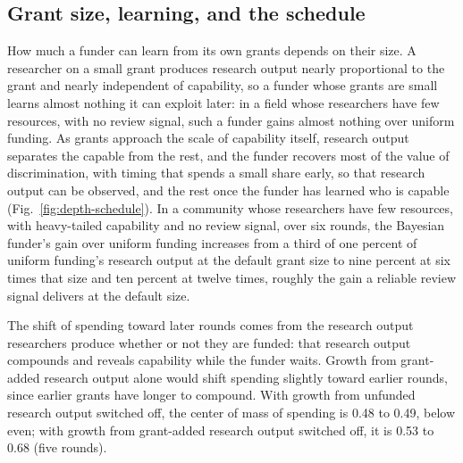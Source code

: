 

\subsection*{Grant size, learning, and the schedule}
How much a funder can learn from its own grants depends on their size. A researcher on a small grant produces research output nearly proportional to the grant and nearly independent of capability, so a funder whose grants are small learns almost nothing it can exploit later: in a field whose researchers have few resources, with no review signal, such a funder gains almost nothing over uniform funding. As grants approach the scale of capability itself, research output separates the capable from the rest, and the funder recovers most of the value of discrimination, with timing that spends a small share early, so that research output can be observed, and the rest once the funder has learned who is capable (Fig.~\ref{fig:depth-schedule}). In a community whose researchers have few resources, with heavy-tailed capability and no review signal, over six rounds, the Bayesian funder's gain over uniform funding increases from a third of one percent of uniform funding's research output at the default grant size to nine percent at six times that size and ten percent at twelve times, roughly the gain a reliable review signal delivers at the default size.

The shift of spending toward later rounds comes from the research output researchers produce whether or not they are funded: that research output compounds and reveals capability while the funder waits. Growth from grant-added research output alone would shift spending slightly toward earlier rounds, since earlier grants have longer to compound. With growth from unfunded research output switched off, the center of mass of spending is 0.48 to 0.49, below even; with growth from grant-added research output switched off, it is 0.53 to 0.68 (five rounds).



